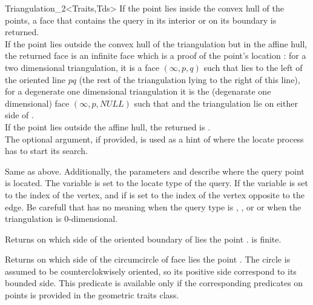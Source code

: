 \begin{ccClassTemplate}{Triangulation_2<Traits,Tds>}
{If the point  lies inside the convex hull of the points, a face 
that contains the query in its interior or on its
 boundary is returned.\\
If the point  lies outside the convex hull of the
triangulation but in the affine hull,
the returned face is an infinite face which is a proof of the point's
location :
for a two dimensional triangulation, it is a face $(\infty, p, q)$ 
such that
 lies to the left  of the oriented line $pq$ 
(the rest of the triangulation lying to the right of this line),
for a degenerate one dimensional triangulation it is the (degenarate
one dimensional) face $(\infty, p, NULL)$ such that 
and the triangulation lie on either side of . \\
If the point  lies outside the affine hull,
the returned  is . \\
The optional  argument, if provided, is used as a hint
of where the locate process has to start its search.}

{Same as above. Additionally, the parameters 
 and 
describe where the query point is located. 
The variable  is set to the locate type of the query.
If  
the variable 
is set to the index of the vertex, and if 
is set to the index 
of the vertex opposite to the
edge. 
Be carefull that 
has no meaning when the query type is , , 
or  or when the
triangulation is $0$-dimensional.}

{Returns on which side of the oriented boundary of  lies 
the point . \ccPrecond {} is finite.}

{Returns on which side of the circumcircle  of face  lies 
the point . The circle is assumed to be counterclokwisely
oriented, so its positive
side correspond to its bounded side.
This predicate is available only if the corresponding predicates on
points is provided in the geometric traits class.}


\end{ccClassTemplate}
